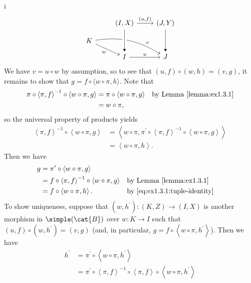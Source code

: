\begin{partsolution}{i}
\begin{equation*}
\begin{tikzcd}[row sep=small]
& {(I, X)} \arrow[dd, -Triangle] \arrow[r, "{(u, f)}"{above}]
& {(J, Y)} \arrow[dd, -Triangle] \\
K \arrow[dr, "w"{below left}] \arrow[drr, bend left=20, near end, "v"{above right}] \\
& I \arrow[r, "u"]
& J
\arrow[from=uul, to=l, -Triangle, crossing over]
\end{tikzcd}
\end{equation*}
We have \(v = u \circ w\) by assumption, so to see that \((u, f) \circ (w, h) = (v, g)\), it remains to show that \(g = f \circ \langle w\circ\pi, h\rangle\).
Note that
\begin{align*}
\pi \circ \left\langle \pi, f\right\rangle^{-1} \circ \left\langle w \circ \pi, g\right\rangle
&= \pi \circ \left\langle w \circ \pi, g\right\rangle & &\text{by Lemma~\ref{lemma:ex1.3.1}} \\
&= w \circ \pi,
\end{align*}
so the universal property of products yields
\begin{equation}
\label{eq:ex1.3.1:tuple-identity}
\begin{aligned}
\left\langle \pi, f\right\rangle^{-1} \circ \left\langle w \circ \pi, g\right\rangle
&= \left\langle w \circ \pi, \pi^\prime \circ \left\langle\pi, f\right\rangle^{-1} \circ \left\langle w \circ \pi, g\right\rangle\right\rangle \\
&= \left\langle w \circ \pi, h\right\rangle.
\end{aligned}
\end{equation}
Then we have
\begin{align*}
g
&= \pi^\prime \circ \left\langle w \circ \pi, g\right\rangle \\
&= f \circ \left\langle \pi, f\right\rangle^{-1} \circ \left\langle w \circ \pi, g\right\rangle & &\text{by Lemma~\ref{lemma:ex1.3.1}} \\
&= f \circ \left\langle w \circ \pi, h\right\rangle. & &\text{by~\eqref{eq:ex1.3.1:tuple-identity}}\
\end{align*}
To show uniqueness, suppose that \((w, h^\prime) : (K, Z) \to (I, X)\) is another morphism in \(\simple(\cat{B})\) over \(w: K \to I\) such that \((u, f) \circ (w, h^\prime) = (v, g)\) (and, in particular, \(g = f \circ \left\langle w \circ \pi, h^\prime\right\rangle\)).
Then we have
\begin{align*}
h^\prime
&= \pi^\prime \circ \left\langle w \circ \pi, h^\prime\right\rangle \\
&= \pi^\prime \circ \left\langle \pi, f\right\rangle^{-1} \circ \left\langle \pi, f\right\rangle \circ \left\langle w \circ \pi, h^\prime\right\rangle \\

\end{align*}
\end{partsolution}
